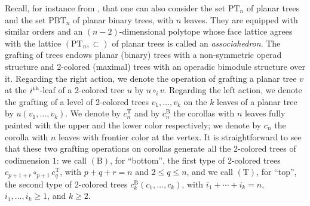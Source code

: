 \documentclass[twoside, 12pt]{amsart}
\theoremstyle{remark}
\newcommand{\Tam}[1]{\mathrm{PBT}_{#1}}
\newcommand{\PT}[1]{\mathrm{PT}_{#1}}
\newcommand{\B}{\mathrm{B}}
\newcommand{\T}{\mathrm{T}}
\begin{document}
Recall, for instance from \cite{MTTV19}, that one can also consider the set $\PT{n}$ of planar trees and the set $\Tam{n}$ of planar binary trees, with $n$ leaves. 
They are equipped with similar orders and an $(n-2)$-dimensional polytope whose face lattice agrees with the lattice $(\PT{n}, \subset)$  of planar trees is called an \emph{associahedron}. 
The grafting of trees endows planar (binary) trees with a non-symmetric operad structure and 2-colored (maximal) trees with an operadic bimodule structure over it. 
Regarding the right action, we denote the operation of grafting a planar tree $v$ at the $i^{\rm th}$-leaf of a 2-colored tree $u$ by $u\circ_i v$. 
Regarding the left action, we denote the grafting of a level of 2-colored trees $v_1, \ldots, v_k$ on the $k$ leaves of a planar tree by $u(v_1, \ldots, v_k)$. 
We denote by $c^{\T}_n$ and by $c^{\B}_n$ the corollas with $n$ leaves fully painted with the upper and the lower color respectively; we denote by $c_n$ the corolla with $n$ leaves with frontier color at the vertex. 
It is straightforward to see that these two grafting operations on corollas generate all the 2-colored trees of codimension $1$: we call $(\B)$, for ``bottom'', the first type of 2-colored trees $c_{p+1+r}\circ_{p+1} c^\T_q$, with $p+q+r=n$ and $2\leq q\leq n$, and we call  $(\T)$, for ``top'', the second type of 2-colored trees $c^\B_k(c_1, \ldots, c_k)$, with $i_1+\cdots+i_k=n$, $i_1, \ldots,i_k\geq 1$, and $k\geq 2$.
\end{document}
